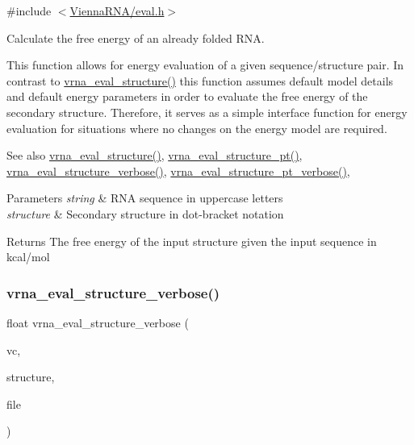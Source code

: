{\ttfamily \#include $<$\hyperlink{eval_8h}{Vienna\+R\+N\+A/eval.\+h}$>$}



Calculate the free energy of an already folded R\+NA. 

This function allows for energy evaluation of a given sequence/structure pair. In contrast to \hyperlink{group__eval_ga58f199f1438d794a265f3b27fc8ea631}{vrna\+\_\+eval\+\_\+structure()} this function assumes default model details and default energy parameters in order to evaluate the free energy of the secondary structure. Therefore, it serves as a simple interface function for energy evaluation for situations where no changes on the energy model are required.

\begin{DoxySeeAlso}{See also}
\hyperlink{group__eval_ga58f199f1438d794a265f3b27fc8ea631}{vrna\+\_\+eval\+\_\+structure()}, \hyperlink{group__eval_gadbd09372ddfd7a450bbd590c96a6bfe4}{vrna\+\_\+eval\+\_\+structure\+\_\+pt()}, \hyperlink{group__eval_ga0928d699d310178f84ee2351034e5cb5}{vrna\+\_\+eval\+\_\+structure\+\_\+verbose()}, \hyperlink{group__eval_ga8a517cfeeae8c376ae7b1e0c401d38b4}{vrna\+\_\+eval\+\_\+structure\+\_\+pt\+\_\+verbose()},
\end{DoxySeeAlso}

\begin{DoxyParams}{Parameters}
{\em string} & R\+NA sequence in uppercase letters \\
\hline
{\em structure} & Secondary structure in dot-\/bracket notation \\
\hline
\end{DoxyParams}
\begin{DoxyReturn}{Returns}
The free energy of the input structure given the input sequence in kcal/mol 
\end{DoxyReturn}
\mbox{\label{group__eval_ga0928d699d310178f84ee2351034e5cb5}} 
\subsubsection{\texorpdfstring{vrna\+\_\+eval\+\_\+structure\+\_\+verbose()}{vrna\_eval\_structure\_verbose()}}
{\footnotesize\ttfamily float vrna\+\_\+eval\+\_\+structure\+\_\+verbose (\begin{DoxyParamCaption}\item[{\hyperlink{group__fold__compound_ga1b0cef17fd40466cef5968eaeeff6166}{vrna\+\_\+fold\+\_\+compound\+\_\+t} $\ast$}]{vc,  }\item[{const char $\ast$}]{structure,  }\item[{F\+I\+LE $\ast$}]{file }\end{DoxyParamCaption})}



